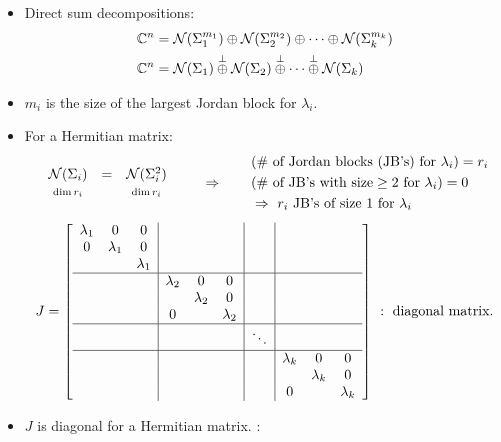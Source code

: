 \begin{itemize}
\item Direct sum decompositions:
\begin{align*}
\mathbb{C}^n&=\mathcal{N}(\Sigma_1^{m_1})\oplus\mathcal{N}(\Sigma_2^{m_2})\oplus\cdots\oplus\mathcal{N}(\Sigma_k^{m_k})\\
\mathbb{C}^n&=\mathcal{N}(\Sigma_1)\overset{\perp}{\oplus}\mathcal{N}(\Sigma_2)\overset{\perp}{\oplus}\cdots\overset{\perp}{\oplus}\mathcal{N}(\Sigma_k)
\end{align*}
\item $m_i$ is the size of the largest Jordan block for $\lambda_i$.
\item\leavevmode{}For a Hermitian matrix:
\[
\begin{array}{ccc}
\mathcal{N}(\Sigma_i)&=&\mathcal{N}(\Sigma_i^2)\\
\scriptstyle\dim r_i&&\scriptstyle\dim r_i
\end{array}
\qquad\Rightarrow\qquad
\begin{aligned}
&(\#\text{ of Jordan blocks (JB's) for }\lambda_i)=r_i\\
&(\#\text{ of JB's with size}\geq2\text{ for }\lambda_i)=0\\
&\Rightarrow\ r_i\text{ JB's of size }1\text{ for }\lambda_i
\end{aligned}
\]
\[
J=\left[\begin{array}{ccc|ccc|c|ccc}
\lambda_1&0&0&&&&&&&\\
0&\lambda_1&0&&&&&&&\\
&&\lambda_1&&&&&&&\\\hline
&&&\lambda_2&0&0&&&&\\
&&&&\lambda_2&0&&&&\\
&&&0&&\lambda_2&&&&\\\hline
&&&&&&\ddots&&&\\\hline
&&&&&&&\lambda_k&0&0\\
&&&&&&&&\lambda_k&0\\
&&&&&&&0&&\lambda_k
\end{array}\right]
\ :\ \text{diagonal matrix.}
\]
\item $J$ is diagonal for a Hermitian matrix. :

\end{itemize}
